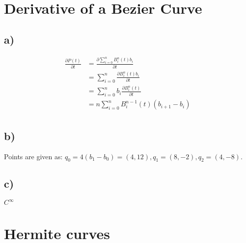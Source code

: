 \documentclass[a4paper]{scrartcl}
\begin{document}
\section{Derivative of a Bezier Curve}
  \subsection{a)}
    \begin{align*}
      \frac{\partial P(t) }{\partial t}
      &= \frac{\partial \sum_{i=0}^n B_i^n(t) b_i}{\partial t}\\
      &= \sum_{i=0}^n  \frac{\partial B_i^n(t) b_i}{\partial t}\\
      &= \sum_{i=0}^n  b_i \frac{\partial B_i^n(t)}{\partial t}\\ %
      &= n \sum_{i=0}^n B_i^{n-1}(t) (b_{i+1}-b_i)\\
    \end{align*}

  \subsection*{b)}
    Points are given as: $q_0 = 4(b_1 - b_0) = (4, 12), q_1 = (8,-2), q_2 = (4,-8)$.

  \subsection*{c)}
    $C^\infty$ 

\section{Hermite curves}
\end{document}
